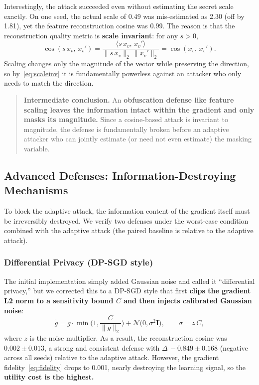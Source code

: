 \documentclass[conference]{IEEEtran}
\begin{document}
Interestingly, the attack succeeded even without estimating the secret scale
exactly. On one seed, the actual scale of 0.49 was mis-estimated as 2.30 (off by
1.81), yet the feature reconstruction cosine was 0.99. The reason is that the
reconstruction quality metric is \textbf{scale invariant}: for any $s>0$,
\begin{equation}
\cos(s\,x_v,\,x_v')=\frac{\langle s\,x_v,\,x_v'\rangle}{\|s\,x_v\|_2\,\|x_v'\|_2}
=\cos(x_v,\,x_v') .
\label{eq:scaleinv}
\end{equation}
Scaling changes only the magnitude of the vector while preserving the direction,
so by~\eqref{eq:scaleinv} it is fundamentally powerless against an attacker who
only needs to match the direction.

\begin{quotation}
\noindent\textbf{Intermediate conclusion.} An \textbf{obfuscation defense like
feature scaling leaves the information intact within the gradient and only masks
its magnitude.} Since a cosine-based attack is invariant to magnitude, the defense
is fundamentally broken before an adaptive attacker who can jointly estimate (or
need not even estimate) the masking variable.
\end{quotation}

\subsection{Advanced Defenses: Information-Destroying Mechanisms}
To block the adaptive attack, the information content of the gradient itself must
be irreversibly destroyed. We verify two defenses under the worst-case condition
combined with the adaptive attack (the paired baseline is relative to the
adaptive attack).

\subsubsection{Differential Privacy (DP-SGD style)}
The initial implementation simply added Gaussian noise and called it
``differential privacy,'' but we corrected this to a DP-SGD style that first
\textbf{clips the gradient L2 norm to a sensitivity bound $C$ and then injects
calibrated Gaussian noise}:
\begin{equation}
\tilde{g}=g\cdot\min\!\Big(1,\frac{C}{\|g\|_2}\Big)
+\mathcal{N}\!\big(0,\sigma^2 \mathbf{I}\big),\qquad \sigma=z\,C ,
\label{eq:dp}
\end{equation}
where $z$ is the noise multiplier. As a result, the reconstruction cosine was
\textbf{$0.002\pm0.013$}, a strong and consistent defense with
$\Delta\,{-}0.849\pm0.168$ (negative across all seeds) relative to the adaptive
attack. However, the gradient fidelity~\eqref{eq:fidelity} drops to 0.001, nearly
destroying the learning signal, so the \textbf{utility cost is the highest.}
\end{document}
